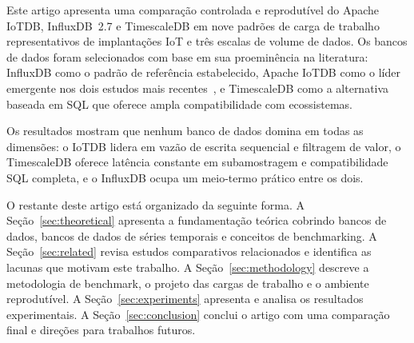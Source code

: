Este artigo apresenta uma comparação controlada e reprodutível do Apache IoTDB, InfluxDB~2.7
e TimescaleDB em nove padrões de carga de trabalho representativos de implantações IoT e
três escalas de volume de dados. Os bancos de dados foram selecionados com base em sua
proeminência na literatura: InfluxDB como o padrão de referência
estabelecido, Apache IoTDB como o líder emergente nos dois estudos mais recentes~\citep{pereira2023mulletbench,wang2023iotdb},
e TimescaleDB como a alternativa baseada em SQL que oferece ampla compatibilidade com
ecossistemas.

Os resultados mostram que nenhum banco de dados domina em todas as dimensões: o IoTDB lidera em
vazão de escrita sequencial e filtragem de valor, o TimescaleDB oferece latência constante em
subamostragem e compatibilidade SQL completa, e o InfluxDB ocupa um meio-termo prático entre
os dois.

O restante deste artigo está organizado da seguinte forma.
A Seção~\ref{sec:theoretical} apresenta a fundamentação teórica cobrindo bancos de dados,
bancos de dados de séries temporais e conceitos de benchmarking.
A Seção~\ref{sec:related} revisa estudos comparativos relacionados e identifica as lacunas
que motivam este trabalho.
A Seção~\ref{sec:methodology} descreve a metodologia de benchmark, o projeto das cargas de
trabalho e o ambiente reprodutível.
A Seção~\ref{sec:experiments} apresenta e analisa os resultados experimentais.
A Seção~\ref{sec:conclusion} conclui o artigo com uma comparação final e direções para
trabalhos futuros.
